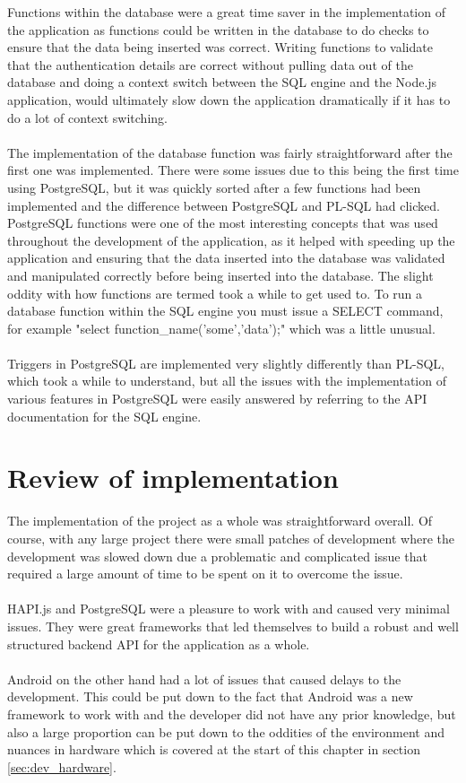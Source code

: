 Functions within the database were a great time saver in the implementation of the application as functions could be written in the database to do checks to ensure that the data being inserted was correct. Writing functions to validate that the authentication details are correct without pulling data out of the database and doing a context switch between the SQL engine and the Node.js application, would ultimately slow down the application dramatically if it has to do a lot of context switching.\\
\\
The implementation of the database function was fairly straightforward after the first one was implemented. There were some issues due to this being the first time using PostgreSQL, but it was quickly sorted after a few functions had been implemented and the difference between PostgreSQL and PL-SQL had clicked. PostgreSQL functions were one of the most interesting concepts that was used throughout the development of the application, as it helped with speeding up the application and ensuring that the data inserted into the database was validated and manipulated correctly before being inserted into the database. The slight oddity with how functions are termed took a while to get used to. To run a database function within the SQL engine you must issue a SELECT command, for example "select function\_name('some','data');" which was a little unusual.\\
\\
Triggers in PostgreSQL are implemented very slightly differently than PL-SQL, which took a while to understand, but all the issues with the implementation of various features in PostgreSQL were easily answered by referring to the API documentation \cite{Postgres:APIDocumentation:2015:online} for the SQL engine.

\section{Review of implementation}

The implementation of the project as a whole was straightforward overall. Of course, with any large project there were small patches of development where the development was slowed down due a problematic and complicated issue that required a large amount of time to be spent on it to overcome the issue.\\
\\
HAPI.js and PostgreSQL were a pleasure to work with and caused very minimal issues. They were great frameworks that led themselves to build a robust and well structured backend API for the application as a whole.\\
\\
Android on the other hand had a lot of issues that caused delays to the development. This could be put down to the fact that Android was a new framework to work with and the developer did not have any prior knowledge, but also a large proportion can be put down to the oddities of the environment and nuances in hardware which is covered at the start of this chapter in section \ref{sec:dev_hardware}.
